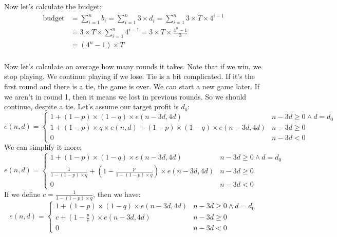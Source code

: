 \documentclass{book}
\begin{document}
	Now let's calculate the budget:
	\begin{equation*}
		\begin{split}
			\text{budget} &= \sum_{i = 1}^{n}{b_i} = \sum_{i = 1}^{n}{3 \times d_i} = \sum_{i = 1}^{n}{3 \times T \times 4^{i - 1}} \\
			&= 3 \times T \times \sum_{i = 1}^{n}{4^{i - 1}} = 3 \times T \times \frac{4^n - 1}{3} \\
			&= (4^n - 1) \times T
		\end{split}
	\end{equation*} \\
	Now let's calculate on average how many rounds it takes. Note that if we win, we stop playing. We continue playing if we lose. Tie is a bit complicated. If it's the first round and there is a tie, the game is over. We can start a new game later. If we aren't in round 1, then it means we lost in previous rounds. So we should continue, despite a tie. Let's assume our target profit is $d_0$:
	\begin{equation*}
		e(n, d) = \begin{cases}
			1 + (1 - p) \times (1 - q) \times e(n - 3d, 4d) & n - 3d \ge 0 \land d = d_0 \\
			1 + (1 - p) \times q \times e(n, d) + (1 - p) \times (1 - q) \times e(n - 3d, 4d) & n - 3d \ge 0 \\
			0 & n - 3d < 0
		\end{cases}
	\end{equation*}
	We can simplify it more:
	\begin{equation*}
		e(n, d) = \begin{cases}
			1 + (1 - p) \times (1 - q) \times e(n - 3d, 4d) & n - 3d \ge 0 \land d = d_0 \\			
			\frac{1}{1 - (1 - p) \times q} + (1 - \frac{p}{1 - (1 - p) \times q}) \times e(n - 3d, 4d) & n - 3d \ge 0 \\
			0 & n - 3d < 0
		\end{cases}
	\end{equation*}	
	If we define $c = \frac{1}{1 - (1 - p) \times q}$, then we have:
	\begin{equation*}
	e(n, d) = \begin{cases}
		1 + (1 - p) \times (1 - q) \times e(n - 3d, 4d) & n - 3d \ge 0 \land d = d_0 \\		
		c + (1 - \frac{p}{c}) \times e(n - 3d, 4d) & n - 3d \ge 0 \\
		0 & n - 3d < 0
	\end{cases}
	\end{equation*}	
\end{document}
